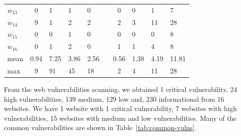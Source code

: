 \documentclass[conference]{IEEEtran}
\begin{document}
\begin{table}[thbp]
\begin{tabular}{lcllllclll}
          $w_{13}$ & 0 & 1 & 1 & 0 &  & 0 & 0 & 1 & 7 \\
          $w_{14}$ & 9 & 1 & 2 & 2 &  & 2 & 3 & 11 & 28 \\
          $w_{15}$ & 0 & 0 & 1 & 0 &  & 0 & 0 & 0 & 8 \\
          $w_{16}$ & 0 & 1 & 2 & 0 &  & 1 & 1 & 4 & 8 \\ \cline{2-5} \cline{7-10} 
          mean &0.94 & 7.25 & 3.86 & 2.56 & & 0.56 & 1.38 & 4.19 & 11.81 \\
          max & 9 & 91 & 45 & 18 & & 2 & 4 & 11 & 28 \\ \hline
	\end{tabular}
\end{table}

From the web vulnerabilities scanning, we obtained 1 critical
vulnerability, 24 high vulnerabilities, 139 medium, 129 low and, 230
informational from 16 websites. We have 1 website with 1 critical 
vulnerability, 7
websites with high vulnerabilities, 15 websites with medium and low
vulnerabilities. Many of the common vulnerabilities are shown in
Table~\ref{tab:common-vulns}.
\end{document}
